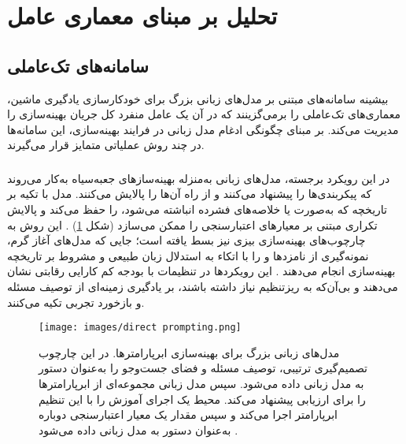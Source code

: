 
\section{تحلیل بر مبنای معماری عامل}
\subsection{سامانه‌های تک‌عاملی}

بیشینه سامانه‌های مبتنی بر مدل‌های زبانی بزرگ برای خودکارسازی یادگیری ماشین، معماری‌های تک‌عاملی را برمی‌گزینند که در آن یک عامل منفرد کل جریان بهینه‌سازی را مدیریت می‌کند. بر مبنای چگونگی ادغام مدل زبانی در فرایند بهینه‌سازی، این سامانه‌ها در چند روش عملیاتی متمایز قرار می‌گیرند.

\subsubsection{\protect{}}
در این رویکرد برجسته، مدل‌های زبانی به‌منزله بهینه‌سازهای جعبه‌سیاه به‌کار می‌روند که پیکربندی‌ها را پیشنهاد می‌کنند و از راه  آن‌ها را پالایش می‌کنند. مدل با تکیه بر تاریخچه  که به‌صورت  یا خلاصه‌های فشرده انباشته می‌شود،  را حفظ می‌کند و پالایش تکراری مبتنی بر معیارهای اعتبارسنجی را ممکن می‌سازد (شکل \ref{fig:llm-hpo}) \cite{zhang2023usingLLMforHPO, zheng2023GENIUS}. این روش به چارچوب‌های بهینه‌سازی بیزی نیز بسط یافته است؛ جایی که مدل‌های آغاز گرم، نمونه‌گیری از نامزدها و  را با اتکاء به استدلال زبان طبیعی و مشروط بر تاریخچه بهینه‌سازی انجام می‌دهند \cite{liu2024LLAMBO}. این رویکردها در تنظیمات با بودجه کم کارایی رقابتی نشان می‌دهند و بی‌آن‌که به ریزتنظیم نیاز داشته باشند، بر یادگیری زمینه‌ای از توصیف مسئله و بازخورد تجربی تکیه می‌کنند.
\begin{figure}[h]
    \centerline{\texttt{[image: images/direct prompting.png]}}
    \caption[مدل زبانیها برای بهینه‌سازی ابرپارامترها]{مدل‌های زبانی بزرگ برای بهینه‌سازی ابرپارامترها. در این چارچوب تصمیم‌گیری ترتیبی، توصیف مسئله و فضای جست‌وجو را به‌عنوان دستور به مدل زبانی داده می‌شود. سپس مدل زبانی مجموعه‌ای از ابرپارامترها را برای ارزیابی پیشنهاد می‌کند. محیط یک اجرای آموزش را با این تنظیم ابرپارامتر اجرا می‌کند و سپس مقدار یک معیار اعتبارسنجی دوباره به‌عنوان دستور به مدل زبانی داده می‌شود \cite{zhang2023usingLLMforHPO}.}
    \label{fig:llm-hpo}
\end{figure}

